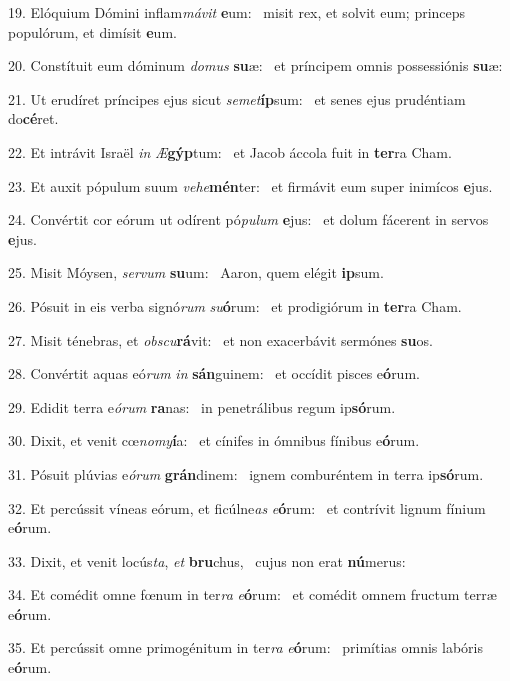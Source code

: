 19. Elóquium Dómini inflam\textit{má}\textit{vit} \textbf{e}um: \ast\  misit rex, et solvit eum; princeps populórum, et dimísit \textbf{e}um.\

20. Constítuit eum dóminum \textit{do}\textit{mus} \textbf{su}æ: \ast\  et príncipem omnis possessiónis \textbf{su}æ:\

21. Ut erudíret príncipes ejus sicut \textit{se}\textit{met}\textbf{íp}sum: \ast\  et senes ejus prudéntiam do\textbf{cé}ret.\

22. Et intrávit Israël \textit{in} \textit{Æ}\textbf{gýp}tum: \ast\  et Jacob áccola fuit in \textbf{ter}ra Cham.\

23. Et auxit pópulum suum \textit{ve}\textit{he}\textbf{mén}ter: \ast\  et firmávit eum super inimícos \textbf{e}jus.\

24. Convértit cor eórum ut odírent pó\textit{pu}\textit{lum} \textbf{e}jus: \ast\  et dolum fácerent in servos \textbf{e}jus.\

25. Misit Móysen, \textit{ser}\textit{vum} \textbf{su}um: \ast\  Aaron, quem elégit \textbf{ip}sum.\

26. Pósuit in eis verba signó\textit{rum} \textit{su}\textbf{ó}rum: \ast\  et prodigiórum in \textbf{ter}ra Cham.\

27. Misit ténebras, et \textit{obs}\textit{cu}\textbf{rá}vit: \ast\  et non exacerbávit sermónes \textbf{su}os.\

28. Convértit aquas eó\textit{rum} \textit{in} \textbf{sán}guinem: \ast\  et occídit pisces e\textbf{ó}rum.\

29. Edidit terra e\textit{ó}\textit{rum} \textbf{ra}nas: \ast\  in penetrálibus regum ip\textbf{só}rum.\

30. Dixit, et venit cœ\textit{no}\textit{my}\textbf{í}a: \ast\  et cínifes in ómnibus fínibus e\textbf{ó}rum.\

31. Pósuit plúvias e\textit{ó}\textit{rum} \textbf{grán}dinem: \ast\  ignem comburéntem in terra ip\textbf{só}rum.\

32. Et percússit víneas eórum, et ficúlne\textit{as} \textit{e}\textbf{ó}rum: \ast\  et contrívit lignum fínium e\textbf{ó}rum.\

33. Dixit, et venit locús\textit{ta}, \textit{et} \textbf{bru}chus, \ast\  cujus non erat \textbf{nú}merus:\

34. Et comédit omne fœnum in ter\textit{ra} \textit{e}\textbf{ó}rum: \ast\  et comédit omnem fructum terræ e\textbf{ó}rum.\

35. Et percússit omne primogénitum in ter\textit{ra} \textit{e}\textbf{ó}rum: \ast\  primítias omnis labóris e\textbf{ó}rum.\

